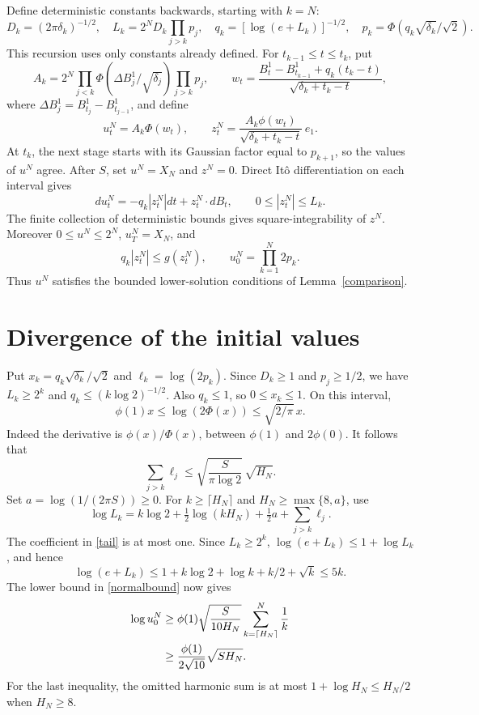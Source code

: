 \documentclass[11pt]{article}
\begin{document}
Define deterministic constants backwards, starting with $k=N$:
\begin{equation}\label{backwards}
 D_k=(2\pi\delta_k)^{-1/2},\quad
 L_k=2^ND_k\prod_{j>k}p_j,\quad
 q_k=[\log(e+L_k)]^{-1/2},\quad
 p_k=\Phi(q_k\sqrt{\delta_k}/\sqrt2).
\end{equation}
This recursion uses only constants already defined. For
$t_{k-1}\leq t\leq t_k$, put
\[
 A_k=2^N\prod_{j<k}\Phi(\Delta B^1_j/\sqrt{\delta_j})
                  \prod_{j>k}p_j,
 \qquad
 w_t=\frac{B^1_t-B^1_{t_{k-1}}+q_k(t_k-t)}{\sqrt{\delta_k+t_k-t}},
\]
where $\Delta B^1_j=B^1_{t_j}-B^1_{t_{j-1}}$, and define
\[
 u^N_t=A_k\Phi(w_t),\qquad
 z^N_t=\frac{A_k\phi(w_t)}{\sqrt{\delta_k+t_k-t}}\,e_1.
\]
At $t_k$, the next stage starts with its Gaussian factor equal to
$p_{k+1}$, so the values of $u^N$ agree. After $S$, set
$u^N=X_N$ and $z^N=0$. Direct It\^o differentiation on each interval gives
\begin{equation}\label{ito}
 du^N_t=-q_k|z^N_t|dt+z^N_t\cdot dB_t,\qquad
 0\leq |z^N_t|\leq L_k.
\end{equation}
The finite collection of deterministic bounds gives square-integrability
of $z^N$. Moreover $0\leq u^N\leq2^N$, $u^N_T=X_N$, and
\[
 q_k|z^N_t|\leq g(z^N_t),\qquad u^N_0=\prod_{k=1}^N2p_k.
\]
Thus $u^N$ satisfies the bounded lower-solution conditions of
Lemma~\ref{comparison}.

\section*{Divergence of the initial values}
Put $x_k=q_k\sqrt{\delta_k}/\sqrt2$ and $\ell_k=\log(2p_k)$.
Since $D_k\geq1$ and $p_j\geq1/2$, we have $L_k\geq2^k$ and
$q_k\leq(k\log2)^{-1/2}$. Also $q_k\leq1$, so $0\leq x_k\leq1$.
On this interval,
\begin{equation}\label{normalbound}
 \phi(1)x\leq\log(2\Phi(x))\leq\sqrt{2/\pi}\,x.
\end{equation}
Indeed the derivative is $\phi(x)/\Phi(x)$, between $\phi(1)$
and $2\phi(0)$. It follows that
\begin{equation}\label{tail}
 \sum_{j>k}\ell_j
 \leq\sqrt{\frac{S}{\pi\log2}}\,\sqrt{H_N}.
\end{equation}
Set $a=\log(1/(2\pi S))\geq0$. For $k\geq\lceil H_N\rceil$ and
$H_N\geq\max\{8,a\}$, use
\[
 \log L_k=k\log2+\tfrac12\log(kH_N)+\tfrac12a+\sum_{j>k}\ell_j.
\]
The coefficient in \eqref{tail} is at most one. Since $L_k\geq2^k$,
$\log(e+L_k)\leq1+\log L_k$, and hence
\[
 \log(e+L_k)\leq1+k\log2+\log k+k/2+\sqrt{k}\leq5k.
\]
The lower bound in \eqref{normalbound} now gives
\begin{align}
 \log u^N_0
 &\geq\phi(1)\sqrt{\frac{S}{10H_N}}
            \sum_{k=\lceil H_N\rceil}^{N}\frac1k\notag\\
 &\geq\frac{\phi(1)}{2\sqrt{10}}\sqrt{SH_N}.\label{divergence}
\end{align}
For the last inequality, the omitted harmonic sum is at most
$1+\log H_N\leq H_N/2$ when $H_N\geq8$.
\end{document}
